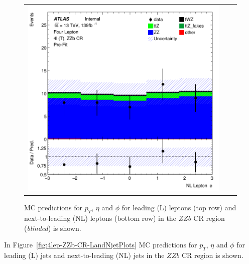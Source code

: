 \begin{figure}[htbp]
\begin{tabular}{ccc}
    \includegraphics[width=.3\textwidth]{figures/PreFitPlots/lep4_ZZb_4T_NL_lepton_phi.png} \\

  \end{tabular}
    \caption{MC predictions for $p_{T}$, $\eta$ and $\phi$ for leading (L) leptons (top row) and next-to-leading (NL) leptons (bottom row) in the $ZZb$ CR region (\textit{blinded}) is shown.}
  \label{fig:4lep-ZZb-CR-leptonPlots}
\end{figure}

In Figure~\ref{fig:4lep-ZZb-CR-LandNjetPlots} MC predictions for $p_{T}$, $\eta$ and $\phi$ for leading (L) jets and next-to-leading (NL) jets in the $ZZb$ CR region is shown.

